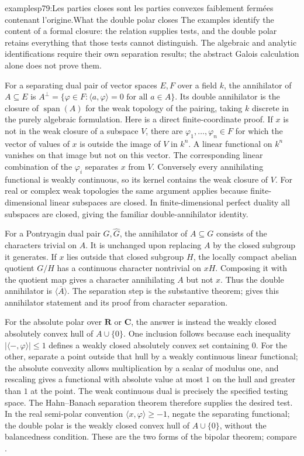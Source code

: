 \begin{dcomment}{examples}{p79:Les parties closes sont les parties convexes faiblement fermées contenant l'origine.}{What the double polar closes}
The examples identify the content of a formal closure: the relation supplies tests, and the double polar retains everything that those tests cannot distinguish. The algebraic and analytic identifications require their own separation results; the abstract Galois calculation alone does not prove them.

For a separating dual pair of vector spaces $E,F$ over a field $k$, the annihilator of $A\subseteq E$ is $A^\perp=\{\varphi\in F:\langle a,\varphi\rangle=0\text{ for all }a\in A\}$. Its double annihilator is the closure of $\operatorname{span}(A)$ for the weak topology of the pairing, taking $k$ discrete in the purely algebraic formulation. Here is a direct finite-coordinate proof. If $x$ is not in the weak closure of a subspace $V$, there are $\varphi_1,\ldots,\varphi_n\in F$ for which the vector of values of $x$ is outside the image of $V$ in $k^n$. A linear functional on $k^n$ vanishes on that image but not on this vector. The corresponding linear combination of the $\varphi_i$ separates $x$ from $V$. Conversely every annihilating functional is weakly continuous, so its kernel contains the weak closure of $V$. For real or complex weak topologies the same argument applies because finite-dimensional linear subspaces are closed. In finite-dimensional perfect duality all subspaces are closed, giving the familiar double-annihilator identity.

For a Pontryagin dual pair $G,\widehat G$, the annihilator of $A\subseteq G$ consists of the characters trivial on $A$. It is unchanged upon replacing $A$ by the closed subgroup it generates. If $x$ lies outside that closed subgroup $H$, the locally compact abelian quotient $G/H$ has a continuous character nontrivial on $xH$. Composing it with the quotient map gives a character annihilating $A$ but not $x$. Thus the double annihilator is $\overline{\langle A\rangle}$. The separation step is the substantive theorem; \citet[Chapter 7, Proposition 38]{Morris1977} gives this annihilator statement and its proof from character separation.

For the absolute polar over $\mathbf R$ or $\mathbf C$, the answer is instead the weakly closed absolutely convex hull of $A\cup\{0\}$. One inclusion follows because each inequality $|\langle -,\varphi\rangle|\leq1$ defines a weakly closed absolutely convex set containing $0$. For the other, separate a point outside that hull by a weakly continuous linear functional; the absolute convexity allows multiplication by a scalar of modulus one, and rescaling gives a functional with absolute value at most $1$ on the hull and greater than $1$ at the point. The weak continuous dual is precisely the specified testing space. The Hahn--Banach separation theorem therefore supplies the desired test. In the real semi-polar convention $\langle x,\varphi\rangle\geq-1$, negate the separating functional; the double polar is the weakly closed convex hull of $A\cup\{0\}$, without the balancedness condition. These are the two forms of the bipolar theorem; compare \citet[Chapter IV, \S1, Theorem 1.5]{SchaeferWolff1999}.


\end{dcomment}
